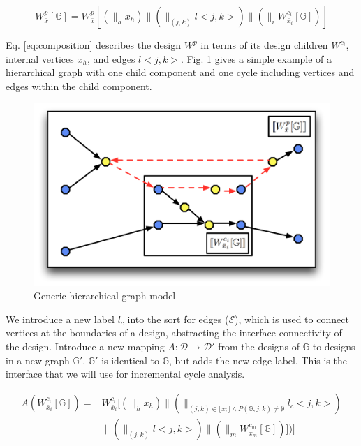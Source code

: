 \begin{equation}
W_{\bar{x}}^p [\mathbb{G}] = W_{\bar{x}}^p [ (\parallel_{h} x_h) \parallel
(\parallel_{(j,k)} l< j,k >) \parallel (\parallel_{i} W_{\bar{x}_i}^{c_i} 
[\mathbb{G}]) ]
\label{eq:composition}
\end{equation}

Eq. \ref{eq:composition} describes the design $W^p$ in terms of its design 
children $W^{c_i}$, internal vertices $x_h$, and edges $l <j,k>$.   Fig. \ref{fig:hier_cycle} gives a simple example of a hierarchical graph with one child component and one cycle including vertices and edges within the child component.

\begin{figure}[htb]	
    \begin{center}
    \centerline{\includegraphics[width=0.7\columnwidth]{figures/original_graph.png}}
    \caption{Generic hierarchical graph model}
    \label{fig:hier_cycle}
    \end{center}	
\end{figure}

We introduce a new label $l_c$ into the sort for edges ($\mathcal{E}$),  
which is used to connect vertices at the boundaries of a design, 
abstracting the interface connectivity of the design. Introduce 
a new mapping $A: \mathcal{D} \rightarrow \mathcal{D}'$ from the 
designs of $\mathbb{G}$ to designs in a new graph $\mathbb{G}'$.  
$\mathbb{G}'$ is identical to $\mathbb{G}$, but adds the new edge
label.  This is the interface that we will use for incremental cycle
analysis.

\begin{align}
A( W_{\bar{x}_i}^{c_i} [\mathbb{G}] ) = & W_{\bar{x}_i}^{c_i} 
[ (\parallel_h x_h) \parallel 
(\parallel_{(j,k) \in \lfloor \bar{x}_i \rfloor \wedge P(\mathbb{G},j,k) 
\neq \emptyset} l_c <j,k>) \\
 & \parallel (\parallel_{(j,k)} l<j,k> )
\parallel (\parallel_m W_{\bar{x}_m}^{c_m} [\mathbb{G}]) ]) ] \nonumber
\end{align}

